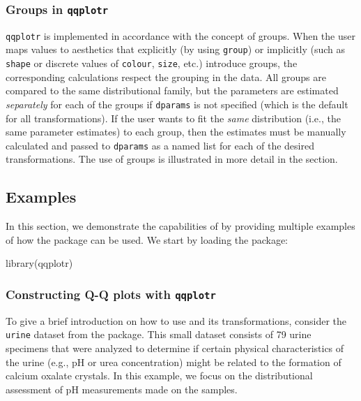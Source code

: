 \subsubsection{\texorpdfstring{Groups in
\texttt{qqplotr}}{Groups in qqplotr}}\label{groups-in-qqplotr}

\texttt{qqplotr} is implemented in accordance with the 
concept of groups. When the user maps values to aesthetics that
explicitly (by using \texttt{group}) or implicitly (such as
\texttt{shape} or discrete values of \texttt{colour}, \texttt{size},
etc.) introduce groups, the corresponding calculations respect the
grouping in the data. All groups are compared to the same distributional
family, but the parameters are estimated \emph{separately} for each of
the groups if \texttt{dparams} is not specified (which is the default
for all transformations). If the user wants to fit the \emph{same}
distribution (i.e., the same parameter estimates) to each group, then
the estimates must be manually calculated and passed to \texttt{dparams}
as a named list for each of the desired  transformations.
The use of groups is illustrated in more detail in the
 section.

\FloatBarrier

\subsection{Examples}\label{examples}

\label{sec:examples}

In this section, we demonstrate the capabilities of  by
providing multiple examples of how the package can be used. We start by
loading the package:

\begin{Schunk}
\begin{Sinput}
library(qqplotr)
\end{Sinput}
\end{Schunk}

\subsubsection{\texorpdfstring{Constructing Q-Q plots with
\texttt{qqplotr}}{Constructing Q-Q plots with qqplotr}}\label{constructing-q-q-plots-with-qqplotr}

To give a brief introduction on how to use  and its
transformations, consider the \texttt{urine} dataset from the 
package. This small dataset consists of 79 urine specimens that were
analyzed to determine if certain physical characteristics of the urine
(e.g., pH or urea concentration) might be related to the formation of
calcium oxalate crystals. In this example, we focus on the
distributional assessment of pH measurements made on the samples.


